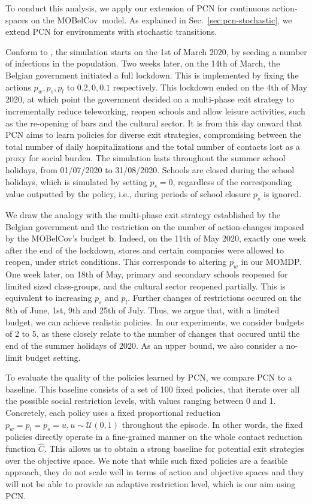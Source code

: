 \documentclass{article}
\newcommand{\momdpname}{MOBelCov}
\newcommand{\budget}{\bm{b}}
\begin{document}
To conduct this analysis, we apply our extension of PCN for continuous action-spaces on the \momdpname\ model. As explained in Sec.~\ref{sec:pcn-stochastic}, we extend PCN for environments with stochastic transitions.

Conform to \citet{abrams2021modelling}, the simulation starts on the 1st of March 2020, by seeding a number of infections in the population. Two weeks later, on the 14th of March, the Belgian government initiated a full lockdown. This is implemented by fixing the actions $p_w, p_s, p_l$ to $0.2, 0, 0.1$ respectively. This lockdown ended on the 4th of May 2020, at which point the government decided on a multi-phase exit strategy to incrementally reduce teleworking, reopen schools and allow leisure activities, such as the re-opening of bars and the cultural sector. It is from this day onward that PCN aims to learn policies for diverse exit strategies, compromising between the total number of daily hospitalizations and the total number of contacts lost as a proxy for social burden. The simulation lasts throughout the summer school holidays, from 01/07/2020 to 31/08/2020. Schools are closed during the school holidays, which is simulated by setting $p_s = 0$, regardless of the corresponding value outputted by the policy, i.e., during periods of school closure $p_s$ is ignored.

We draw the analogy with the multi-phase exit strategy established by the Belgian government and the restriction on the number of action-changes imposed by the \momdpname's budget $\budget$. Indeed, on the 11th of May 2020, exactly one week after the end of the lockdown, stores and certain companies were allowed to reopen, under strict conditions. This corresponds to altering $p_w$ in our MOMDP. One week later, on 18th of May, primary and secondary schools reopened for limited sized class-groups, and the cultural sector reopened partially. This is equivalent to increasing $p_s$ and $p_l$. Further changes of restrictions occured on the 8th of June, 1st, 9th and 25th of July. Thus, we argue that, with a limited budget, we can achieve realistic policies. In our experiments, we consider budgets of 2 to 5, as these closely relate to the number of changes that occured until the end of the summer holidays of 2020. As an upper bound, we also consider a no-limit budget setting.

To evaluate the quality of the policies learned by PCN, we compare PCN to a baseline. This baseline consists of a set of 100 fixed policies, that iterate over all the possible social restriction levels, with values ranging between 0 and 1. Concretely, each policy uses a fixed proportional reduction $p_w=p_l=p_s=u, u\sim\mathcal{U}(0, 1)$ throughout the episode. In other words, the fixed policies directly operate in a fine-grained manner on the whole contact reduction function $\hat{C}$. This allows us to obtain a strong baseline for potential exit strategies over the objective space. We note that while such fixed policies are a feasible approach, they do not scale well in terms of action and objective spaces and they will not be able to provide an adaptive restriction level, which is our aim using PCN.
\end{document}
